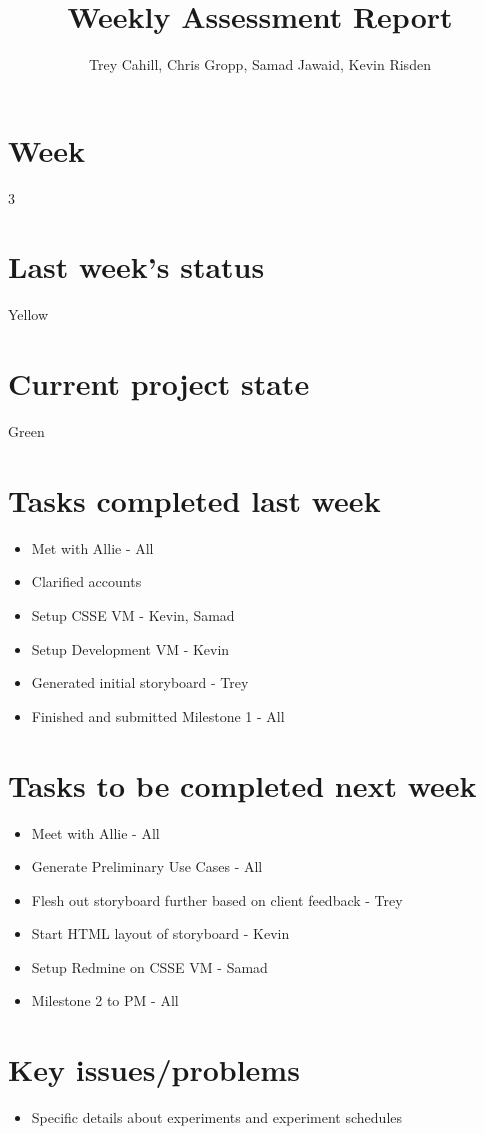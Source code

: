 \documentclass{article}
\title{Weekly Assessment Report}
\author{Trey Cahill, Chris Gropp, Samad Jawaid, Kevin Risden}
\begin{document}
\maketitle
\section{Week}
3
\section{Last week's status}
Yellow
\section{Current project state}
Green
\section{Tasks completed last week}
\begin{itemize}
\item Met with Allie - All
\item Clarified accounts 
\item Setup CSSE VM - Kevin, Samad
\item Setup Development VM - Kevin
\item Generated initial storyboard - Trey
\item Finished and submitted Milestone 1 - All
\end{itemize}
\section{Tasks to be completed next week}
\begin{itemize}
\item Meet with Allie - All
\item Generate Preliminary Use Cases - All
\item Flesh out storyboard further based on client feedback - Trey
\item Start HTML layout of storyboard - Kevin
\item Setup Redmine on CSSE VM - Samad
\item Milestone 2 to PM - All
\end{itemize}
\section{Key issues/problems}
\begin{itemize}
\item Specific details about experiments and experiment schedules
\end{itemize}
\end{document}
